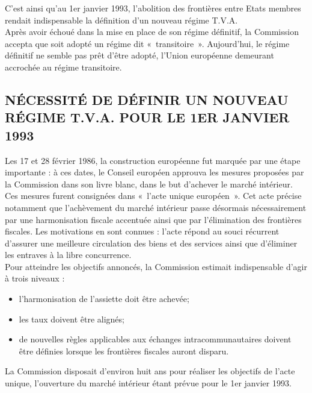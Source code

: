 \documentclass{book}
\begin{document}
C'est ainsi qu'au 1er janvier 1993, l’abolition des frontières entre Etats membres rendait
indispensable la définition d'un nouveau régime T.V.A.\\

Après avoir échoué dans la mise en place de son régime définitif, la Commission
accepta que soit adopté un régime dit «~transitoire~». Aujourd’hui, le régime définitif ne
semble pas prêt d’être adopté, l’Union européenne demeurant accrochée au régime transitoire.

\subsection{NÉCESSITÉ DE DÉFINIR UN NOUVEAU RÉGIME T.V.A. POUR LE 1ER JANVIER 1993}

Les 17 et 28 février 1986, la construction européenne fut marquée par une étape importante : à
ces dates, le Conseil européen approuva les mesures proposées par la Commission dans son
livre blanc, dans le but d'achever le marché intérieur.\\

Ces mesures furent consignées dans «~l'acte unique européen~». Cet acte précise notamment
que l’achèvement du marché intérieur passe désormais nécessairement par une harmonisation
fiscale accentuée ainsi que par l’élimination des frontières fiscales. Les motivations en sont
connues : l’acte répond au souci récurrent d’assurer une meilleure circulation des biens et des
services ainsi que d’éliminer les entraves à la libre concurrence.\\

Pour atteindre les objectifs annoncés, la Commission estimait indispensable d'agir à trois
niveaux :\\

\begin{itemize}
\item l'harmonisation de l'assiette doit être achevée;
\item les taux doivent être alignés;
\item de nouvelles règles applicables aux échanges intracommunautaires doivent être définies lorsque les frontières fiscales auront disparu.
\end{itemize}

\null

La Commission disposait d'environ huit ans pour réaliser les objectifs de l'acte unique,
l'ouverture du marché intérieur étant prévue pour le 1er janvier 1993.\\
\end{document}
